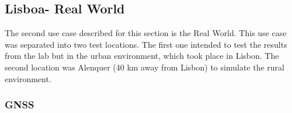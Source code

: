 













\newpage

\subsection{Lisboa- Real World}
\label{subsec:real_world}
The second use case described for this section is the Real World. This use case  was separated into two test locations. The first one intended to test the results from the lab but in the urban environment, which took place in Lisbon. The second location was Alenquer (40 km away from Lisbon) to simulate the  rural environment. 


\subsubsection{GNSS}
\label{subsubsec:GNSS}

